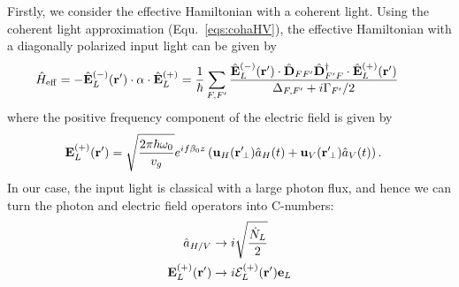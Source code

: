 Firstly, we consider the effective Hamiltonian with a coherent light. Using the coherent light approximation (Equ.~\eqref{eqs:cohaHV}), the effective Hamiltonian with a diagonally polarized input light can be given by
\begin{align}
\!\!\!\!\!\!\hat{H}_{\rm eff} &= -\hat{\mathbf{E}}^{(-)}_L(\mathbf{r}')\cdot \alpha \cdot \hat{\mathbf{E}}^{(+)}_L=\frac{1}{\hbar}\sum_{F,F'} \frac{\hat{\mathbf{E}}^{(-)}_L(\mathbf{r}')\cdot \hat{\mathbf{D}}_{FF'}\hat{\mathbf{D}}_{F'F}^\dagger \cdot  \hat{\mathbf{E}}^{(+)}_L(\mathbf{r}')}{\Delta_{F,F'}+i\Gamma_{F'}/2}
\end{align}
where the positive frequency component of the electric field is given by
\begin{align}
\mathbf{E}^{(+)}_L(\mathbf{r}') &= \sqrt{\frac{2\pi\hbar\omega_0}{v_g}}e^{if\beta_0z} \left( \mathbf{u}_H(\mathbf{r}'\!_\perp)\hat{a}_{H}(t) + \mathbf{u}_{V}(\mathbf{r}'\!_\perp)\hat{a}_{V}(t) \right).
\end{align}
In our case, the input light is classical with a large photon flux, and hence we can turn the photon and electric field operators into C-numbers:
\begin{align}
\hat{a}_{H/V} &\rightarrow i\sqrt{\frac{\dot{N}_L}{2}} \\
\mathbf{E}^{(+)}_L(\mathbf{r}') &\rightarrow i\mathcal{E}_L^{(+)}(\mathbf{r}')\mathbf{e}_L  
\end{align}

